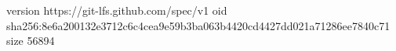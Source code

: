 version https://git-lfs.github.com/spec/v1
oid sha256:8e6a200132e3712c6c4cea9e59b3ba063b4420cd4427dd021a71286ee7840c71
size 56894
